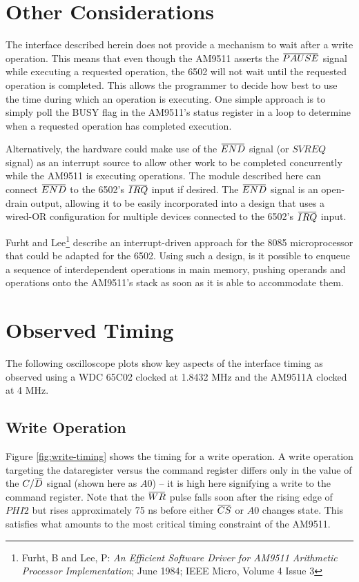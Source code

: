 \documentclass[11pt, letterpaper]{article}
\newcommand{\overbar}[1]{\mkern 1.5mu\overline{\mkern-1.5mu#1\mkern-1.5mu}\mkern 1.5mu}
\begin{document}
\section{Other Considerations}

The interface described herein does not provide a mechanism to wait after a write
operation. This means that even though the AM9511 asserts the $\overbar{PAUSE}$ 
signal while executing a requested operation, the 6502 will not wait until the 
requested operation is completed. This allows the programmer to decide how best 
to use the time during which an operation is executing. One simple approach is 
to simply poll the BUSY flag in the AM9511's status register in a loop
to determine when a requested operation has completed execution. 

Alternatively, the hardware could make use of the $\overbar{END}$ signal (or 
$SVREQ$ signal) as an interrupt source to allow other work to be completed 
concurrently while the AM9511 is executing operations. The module described 
here can connect $\overbar{END}$ to the 6502's $\overbar{IRQ}$ input if desired.
The $\overbar{END}$ signal is an open-drain output, allowing it to be easily
incorporated into a design that uses a wired-OR configuration for multiple
devices connected to the 6502's $\overbar{IRQ}$ input.

Furht and Lee\footnote{Furht, B and Lee, P: \emph{An Efficient Software Driver 
for AM9511 Arithmetic Processor Implementation}; June 1984; IEEE Micro, Volume 4
Issue 3} describe an interrupt-driven approach for the 8085 microprocessor that
could be adapted for the 6502. Using such a design, is it possible to enqueue a
sequence of interdependent operations in main memory, pushing operands and
operations onto the AM9511's stack as soon as it is able to accommodate them.


\pagebreak
\section{Observed Timing}

The following oscilloscope plots show key aspects of the interface timing as 
observed using a WDC 65C02 clocked at 1.8432 MHz and the AM9511A clocked at 
4 MHz.

\subsection{Write Operation}

Figure \ref{fig:write-timing} shows the timing for a write operation. A 
write operation targeting the dataregister versus the command register differs 
only in the value of the $C/\overbar{D}$ signal (shown here as $A0$) -- it is 
high here signifying a write to the command register. Note that the 
$\overbar{WR}$ pulse falls soon after the rising edge of $PHI2$ but rises 
approximately 75 ns before either $\overbar{CS}$ or $A0$ changes state. This 
satisfies what amounts to the most critical timing constraint of the AM9511.
\end{document}
